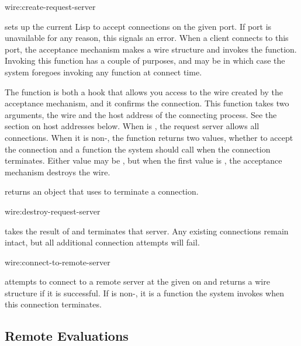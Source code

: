 \begin{defun}{wire:}{create-request-server}{%
    }

   sets up the current Lisp to accept
  connections on the given port.  If port is unavailable for any
  reason, this signals an error.  When a client connects to this port,
  the acceptance mechanism makes a wire structure and invokes the
   function.  Invoking this function has a couple of
  purposes, and  may be \nil{} in which case the
  system foregoes invoking any function at connect time.
  
  The  function is both a hook that allows you access
  to the wire created by the acceptance mechanism, and it confirms the
  connection.  This function takes two arguments, the wire and the
  host address of the connecting process.  See the section on host
  addresses below.  When  is \nil, the request server
  allows all connections.  When it is non-\nil, the function returns
  two values, whether to accept the connection and a function the
  system should call when the connection terminates.  Either value may
  be \nil, but when the first value is \nil, the acceptance mechanism
  destroys the wire.
  
   returns an object that
   uses to terminate a connection.
\end{defun}

\begin{defun}{wire:}{destroy-request-server}{}
  
   takes the result of
   and terminates that server.  Any
  existing connections remain intact, but all additional connection
  attempts will fail.
\end{defun}

\begin{defun}{wire:}{connect-to-remote-server}{%
    }
  
   attempts to connect to a remote
  server at the given  on  and returns a wire
  structure if it is successful.  If  is non-\nil, it is
  a function the system invokes when this connection terminates.
\end{defun}


\subsection{Remote Evaluations}

